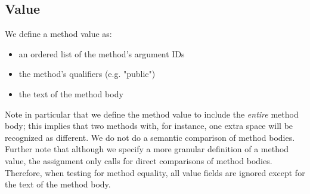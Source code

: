 \subsection{Value}

We define a method value as:

\begin{itemize}
    \item an ordered list of the method's argument IDs
    \item the method's qualifiers (e.g. "public")
    \item the text of the method body
\end{itemize}

Note in particular that we define the method value to include the \textit{entire}
method body; this implies that two methods with, for instance, one extra
space will be recognized as different. We do not do a semantic comparison of
method bodies. Further note that although we specify a more granular
definition of a method value, the assignment only calls for direct comparisons
of method bodies. Therefore, when testing for method equality, all value fields
are ignored except for the text of the method body.
